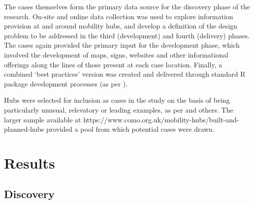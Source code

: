 \documentclass[preprint, 3p,
authoryear]{elsarticle} %
\begin{document}
The cases themselves form the primary data source for the discovery
phase of the research. On-site and online data collection was used to
explore information provision at and around mobility hubs, and develop a
definition of the design problem to be addressed in the third
(development) and fourth (delivery) phases. The cases again provided the
primary input for the development phase, which involved the development
of maps, signs, websites and other informational offerings along the
lines of those present at each case location. Finally, a combined `best
practices' version was created and delivered through standard R package
development processes (as per \citet{wickham2023r}).

Hubs were selected for inclusion as cases in the study on the basis of
being particularly unusual, relevatory or leading examples, as per
\citet{Eisenhardt:1989aa, Voss:2002aa, Denscombe:2007aa, Yin:2018ab} and
others. The larger sample available at
https://www.como.org.uk/mobility-hubs/built-and-planned-hubs provided a
pool from which potential cases were drawn.

\section{Results}\label{results}

\subsection{Discovery}\label{discovery}
\end{document}
